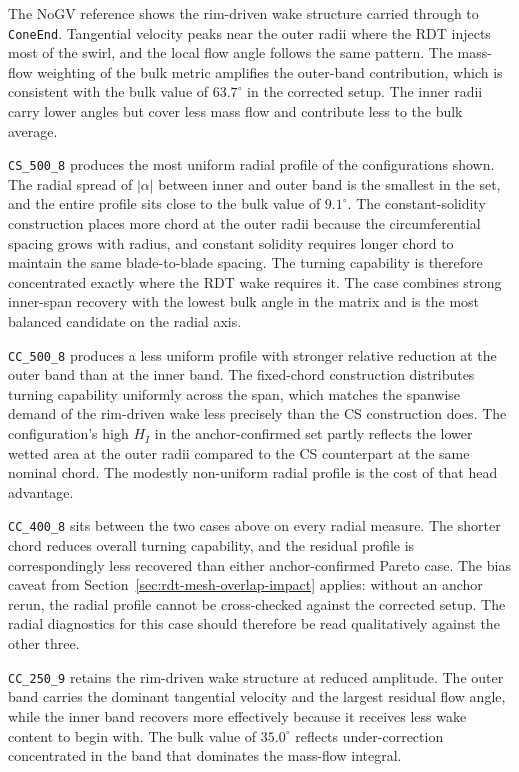 The NoGV reference shows the rim-driven wake structure carried through to \texttt{ConeEnd}. Tangential velocity peaks near the outer radii where the RDT injects most of the swirl, and the local flow angle follows the same pattern. The mass-flow weighting of the bulk metric amplifies the outer-band contribution, which is consistent with the bulk value of $63.7^\circ$ in the corrected setup. The inner radii carry lower angles but cover less mass flow and contribute less to the bulk average.

\texttt{CS\_500\_8} produces the most uniform radial profile of the configurations shown. The radial spread of $|\alpha|$ between inner and outer band is the smallest in the set, and the entire profile sits close to the bulk value of $9.1^\circ$. The constant-solidity construction places more chord at the outer radii because the circumferential spacing grows with radius, and constant solidity requires longer chord to maintain the same blade-to-blade spacing. The turning capability is therefore concentrated exactly where the RDT wake requires it. The case combines strong inner-span recovery with the lowest bulk angle in the matrix and is the most balanced candidate on the radial axis.

\texttt{CC\_500\_8} produces a less uniform profile with stronger relative reduction at the outer band than at the inner band. The fixed-chord construction distributes turning capability uniformly across the span, which matches the spanwise demand of the rim-driven wake less precisely than the CS construction does. The configuration's high $H_I$ in the anchor-confirmed set partly reflects the lower wetted area at the outer radii compared to the CS counterpart at the same nominal chord. The modestly non-uniform radial profile is the cost of that head advantage.

\texttt{CC\_400\_8} sits between the two cases above on every radial measure. The shorter chord reduces overall turning capability, and the residual profile is correspondingly less recovered than either anchor-confirmed Pareto case. The bias caveat from Section~\ref{sec:rdt-mesh-overlap-impact} applies: without an anchor rerun, the radial profile cannot be cross-checked against the corrected setup. The radial diagnostics for this case should therefore be read qualitatively against the other three.

\texttt{CC\_250\_9} retains the rim-driven wake structure at reduced amplitude. The outer band carries the dominant tangential velocity and the largest residual flow angle, while the inner band recovers more effectively because it receives less wake content to begin with. The bulk value of $35.0^\circ$ reflects under-correction concentrated in the band that dominates the mass-flow integral.

